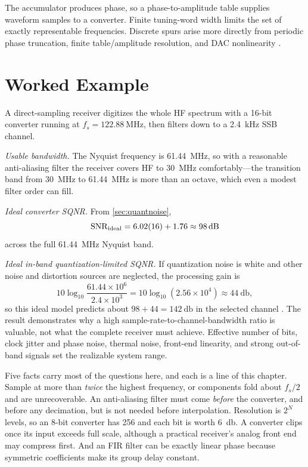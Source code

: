 The accumulator produces phase, so a phase-to-amplitude table supplies waveform
samples to a converter. Finite tuning-word width limits the set of exactly
representable frequencies. Discrete spurs arise more directly from periodic phase
truncation, finite table/amplitude resolution, and DAC nonlinearity
\cite[pp.~97--105]{vankka2005synthesizers}.

\section{Worked Example}
A direct-sampling receiver digitizes the whole HF spectrum with a 16-bit converter
running at \(f_s=\SI{122.88}{\mega\hertz}\), then filters down to a \SI{2.4}{\kilo\hertz}
SSB channel.

\emph{Usable bandwidth.} The Nyquist frequency is \SI{61.44}{\mega\hertz}, so with a
reasonable anti-aliasing filter the receiver covers HF to \SI{30}{\mega\hertz}
comfortably---the transition band from \SI{30}{\mega\hertz} to \SI{61.44}{\mega\hertz}
is more than an octave, which even a modest filter order can fill.

\emph{Ideal converter SQNR.} From \cref{sec:quantnoise},
\[
\mathrm{SNR}_{\rm ideal}=6.02(16)+1.76\approx\SI{98}{\decibel}
\]
across the full \SI{61.44}{\mega\hertz} Nyquist band.

\emph{Ideal in-band quantization-limited SQNR.} If quantization noise is white and
other noise and distortion sources are neglected, the processing gain is
\[
10\log_{10}\frac{61.44\times10^{6}}{2.4\times10^{3}}
=10\log_{10}(2.56\times10^{4})\approx\SI{44}{\decibel},
\]
so this ideal model predicts about \(98+44=\SI{142}{\decibel}\) in the selected
channel \cite[p.~188]{vankka2005synthesizers}. The result demonstrates why a high
sample-rate-to-channel-bandwidth ratio is valuable, not what the complete receiver
must achieve. Effective number of bits, clock jitter and phase noise, thermal noise,
front-end linearity, and strong out-of-band signals set the realizable system range.

\begin{exambox}
Five facts carry most of the questions here, and each is a line of this chapter.
Sample at more than \emph{twice} the highest frequency, or components fold about
\(f_s/2\) and are unrecoverable. An anti-aliasing filter must come \emph{before} the
converter, and before any decimation, but is not needed before interpolation.
Resolution is \(2^N\) levels, so an 8-bit converter has 256 and each bit is worth
\SI{6}{\decibel}. A converter clips once its input exceeds full scale, although a
practical receiver's analog front end may compress first. And an FIR filter can be
exactly linear phase because symmetric coefficients make its group delay constant.
\end{exambox}
